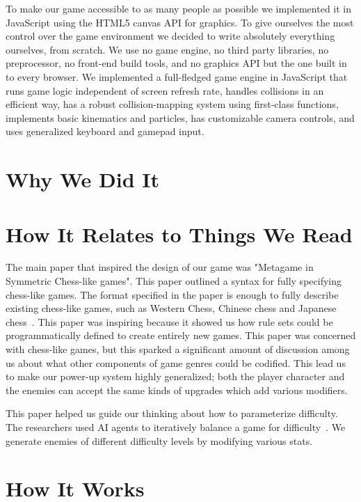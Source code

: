 \documentclass[a4paper, 12pt]{article}
\begin{document}
To make our game accessible to as many people as possible we implemented it in
JavaScript using the HTML5 canvas API for graphics. To give ourselves the most
control over the game environment we decided to write absolutely everything
ourselves, from scratch. We use no game engine, no third party libraries, no
preprocessor, no front-end build tools, and no graphics API but the one built in
to every browser. We implemented a full-fledged game engine in JavaScript that
runs game logic independent of screen refresh rate, handles collisions in an
efficient way, has a robust collision-mapping system using first-class
functions, implements basic kinematics and particles, has customizable camera
controls, and uses generalized keyboard and gamepad input.

\section{Why We Did It}



\section{How It Relates to Things We Read}

The main paper that inspired the design of our game was "Metagame in Symmetric
Chess-like games". This paper outlined a syntax for fully specifying chess-like
games. The format specified in the paper is enough to fully describe existing
chess-like games, such as Western Chess, Chinese chess and Japanese
chess~\autocite{pell1992}. This paper was inspiring because it showed us how
rule sets could be programmatically defined to create entirely new games. This
paper was concerned with chess-like games, but this sparked a significant amount
of discussion among us about what other components of game genres could be
codified. This lead us to make our power-up system highly generalized; both the
player character and the enemies can accept the same kinds of upgrades which add
various modifiers.

This paper helped us guide our thinking about how to parameterize difficulty.
The researchers used AI agents to iteratively balance a game for
difficulty~\autocite{liu2017}. We generate enemies of different difficulty
levels by modifying various stats.


\section{How It Works}
\end{document}
